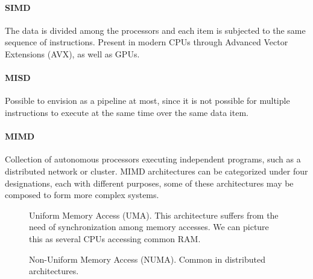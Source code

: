 \paragraph{SIMD}
The data is divided among the processors and each item is subjected to the same sequence of instructions. Present in modern CPUs through Advanced Vector Extensions (AVX), as well as GPUs.


\paragraph{MISD}
Possible to envision as a pipeline at most, since it is not possible for multiple instructions to execute at the same time over the same data item.

\paragraph{MIMD}
Collection of autonomous processors executing independent programs, such as a distributed network or cluster.
MIMD architectures can be categorized under four designations, each with different purposes, some of these architectures may be composed to form more complex systems.

\begin{figure}[h]
    \centering
    \caption{Uniform Memory Access (UMA). This architecture suffers from the need of synchronization among memory accesses. We can picture this as several CPUs accessing common RAM.}
    \label{fig:sm:uma}
\end{figure}

\begin{figure}[h]
    \centering
    \caption{Non-Uniform Memory Access (NUMA). Common in distributed architectures.}
    \label{fig:sm:numa}
\end{figure}


